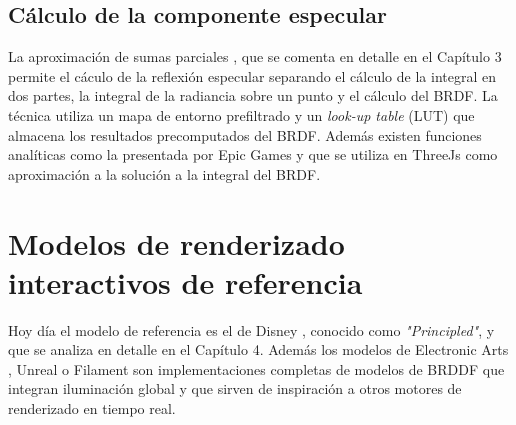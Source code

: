             \subsection{C\'alculo de la componente especular}
            La aproximaci\'on de sumas parciales \autocite{unreal}, que se comenta en detalle en el Cap\'itulo 3 permite el c\'aculo de la reflexi\'on especular separando el c\'alculo
            de la integral en dos partes, la integral de la radiancia sobre un punto y el c\'alculo del BRDF. La t\'ecnica utiliza
            un mapa de entorno prefiltrado y un \textit{look-up table} (LUT) que almacena los resultados precomputados del BRDF.
            Adem\'as existen funciones anal\'iticas como la presentada por Epic Games \autocite{dfgapproximation} y que se utiliza en ThreeJs
            como aproximaci\'on a la soluci\'on a la integral del BRDF.
            

    \section{Modelos de renderizado interactivos de referencia}
        Hoy d\'ia el modelo de referencia es el de Disney \autocite{disney12} \autocite{disney15}, conocido como \textit{"Principled"},
        y que se analiza en detalle en el Cap\'itulo 4. Adem\'as los modelos de Electronic Arts \autocite{frostbite}, Unreal \autocite{unreal}
        o Filament \autocite{filament} son implementaciones completas de modelos de BRDDF que integran iluminaci\'on global y  que sirven
        de inspiraci\'on a otros motores de renderizado en tiempo real.
